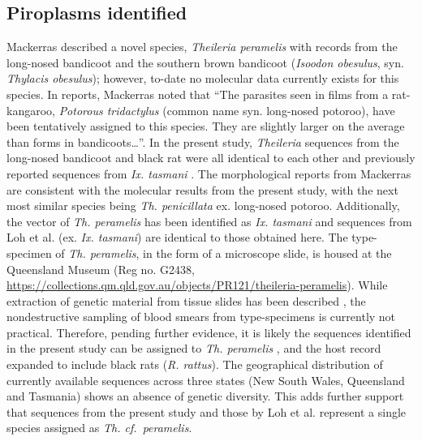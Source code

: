 \documentclass[a4paper, nobind]{templates/ociamthesis}
\begin{document}
\hypertarget{piroplasms-identified}{%
\subsection{Piroplasms identified}\label{piroplasms-identified}}

Mackerras \autocite*{mackerrasHaematozoaAustralianMammals1959} described a novel species, \emph{Theileria peramelis} with records from the long-nosed bandicoot and the southern brown bandicoot (\emph{Isoodon obesulus}, syn. \emph{Thylacis obesulus}); however, to-date no molecular data currently exists for this species.
In reports, Mackerras \autocite*{mackerrasHaematozoaAustralianMammals1959} noted that ``The parasites seen in films from a rat-kangaroo, \emph{Potorous tridactylus} (common name syn. long-nosed potoroo), have been tentatively assigned to this species. They are slightly larger on the average than forms in bandicoots\ldots{}''.
In the present study, \emph{Theileria} sequences from the long-nosed bandicoot and black rat were all identical to each other and previously reported sequences from \emph{Ix. tasmani} \autocite{lohMolecularSurveillancePiroplasms2018}.
The morphological reports from Mackerras \autocite*{mackerrasHaematozoaAustralianMammals1959} are consistent with the molecular results from the present study, with the next most similar species being \emph{Th. penicillata} ex. long-nosed potoroo.
Additionally, the vector of \emph{Th. peramelis} has been identified as \emph{Ix. tasmani} \autocite{weilgamaTransmissionTheileriaPeramelis1986} and sequences from Loh et al. \autocite*{lohMolecularSurveillancePiroplasms2018} (ex. \emph{Ix. tasmani}) are identical to those obtained here.
The type-specimen of \emph{Th. peramelis}, in the form of a microscope slide, is housed at the Queensland Museum (Reg no. G2438, \url{https://collections.qm.qld.gov.au/objects/PR121/theileria-peramelis}).
While extraction of genetic material from tissue slides has been described \autocite{rameshDNAExtractionArchived2019}, the nondestructive sampling of blood smears from type-specimens is currently not practical.
Therefore, pending further evidence, it is likely the sequences identified in the present study can be assigned to \emph{Th. peramelis} \autocite{mackerrasHaematozoaAustralianMammals1959}, and the host record expanded to include black rats (\emph{R. rattus}).
The geographical distribution of currently available sequences across three states (New South Wales, Queensland and Tasmania) shows an absence of genetic diversity.
This adds further support that sequences from the present study and those by Loh et al. \autocite*{lohMolecularSurveillancePiroplasms2018} represent a single species assigned as \emph{Th. cf.~peramelis}.
\end{document}
